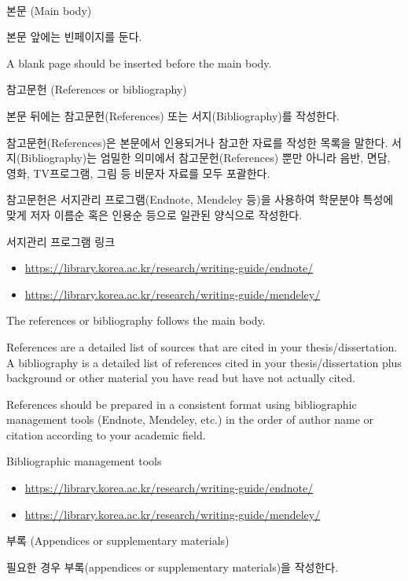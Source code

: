 \documentclass[11pt]{report}
\numberwithin{figure}{chapter}
\theoremstyle{plain}
\theoremstyle{definition}
\theoremstyle{corollary}
\theoremstyle{definition}
\theoremstyle{plain}
\theoremstyle{definition}
\theoremstyle{plain}
\begin{document}
\newpage 

\ %

\newpage
\begin{center}
\large
본문 (Main body)
\end{center}
\normalsize
본문 앞에는 빈페이지를 둔다.

A blank page should be inserted before the main body.

\newpage
\begin{center}
\large
참고문헌 (References or bibliography)
\end{center}
\normalsize
본문 뒤에는 참고문헌(References) 또는 서지(Bibliography)를 작성한다. 

참고문헌(References)은 본문에서 인용되거나 참고한 자료를 작성한 목록을 말한다.
서지(Bibliography)는 엄밀한 의미에서 참고문헌(References) 뿐만 아니라 음반, 면담, 영화, TV프로그램, 그림 등 비문자 자료를 모두 포괄한다.
 
참고문헌은 서지관리 프로그램(Endnote, Mendeley 등)을 사용하여 학문분야 특성에 맞게 저자 이름순 혹은 인용순 등으로 일관된 양식으로 작성한다.

서지관리 프로그램 링크
\begin{itemize}
\item\url{https://library.korea.ac.kr/research/writing-guide/endnote/}
\item\url{https://library.korea.ac.kr/research/writing-guide/mendeley/}
\end{itemize}

The references or bibliography follows the main body. 

References are a detailed list of sources that are cited in your thesis/dissertation.
A bibliography is a detailed list of references cited in your thesis/dissertation plus background or other material you have read but have not actually cited.

References should be prepared in a consistent format using bibliographic management tools (Endnote, Mendeley, etc.) in the order of author name or citation according to your academic field.

Bibliographic management tools
\begin{itemize}
\item\url{https://library.korea.ac.kr/research/writing-guide/endnote/}
\item\url{https://library.korea.ac.kr/research/writing-guide/mendeley/}
\end{itemize}

\newpage
\begin{center}
\large
부록 (Appendices or supplementary materials)
\end{center}
\normalsize
필요한 경우 부록(appendices or supplementary materials)을 작성한다.
\end{document}
